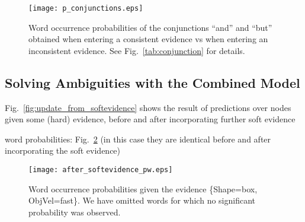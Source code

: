 

\begin{figure}
\centering
\texttt{[image: p\_conjunctions.eps]}
\caption{Word occurrence probabilities of the conjunctions ``and'' and ``but'' obtained when entering a consistent \actioneffect{} evidence vs when entering an inconsistent \actioneffect{} evidence. See Fig.~\ref{tab:conjunction} for details.}
\label{fig:p_conjunctions}
\end{figure}

\subsection{Solving Ambiguities with the Combined Model}

Fig.~\ref{fig:update_from_softevidence} shows the result of predictions over nodes given some (hard) evidence, before and after incorporating further soft evidence

\begin{figure*}
    \centering
     \quad
    \caption{Predictions about the action and hand velocity on a box object, before and after incorporating Action soft evidence from Gesture \acp{HMM}.}
    \label{fig:update_from_softevidence}
\end{figure*}

word probabilities: Fig.~\ref{fig:after_softevidence:pw} (in this case they are identical before and after incorporating the soft evidence)

\begin{figure}
\centering
\texttt{[image: after\_softevidence\_pw.eps]}
\caption{Word occurrence probabilities given the evidence \{Shape=box, ObjVel=fast\}. We have omitted words for which no significant probability was observed.}
\label{fig:after_softevidence:pw}
\end{figure}
